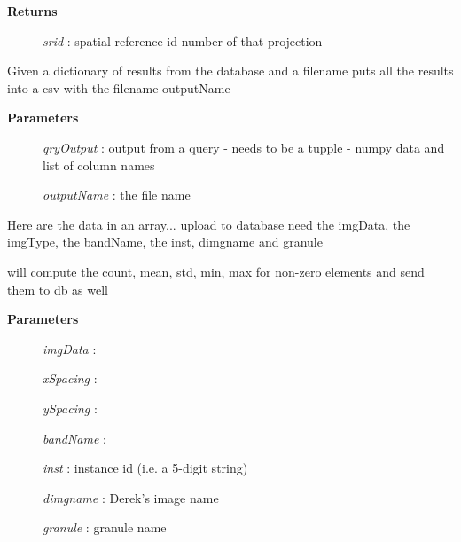 \documentclass[letterpaper,10pt,english]{sphinxmanual}
\begin{document}
\begin{fulllineitems}
\begin{fulllineitems}
\begin{description}
\item[{\textbf{Returns}}] \leavevmode
\emph{srid}  :   spatial reference id number of that projection

\end{description}

\end{fulllineitems}


\begin{fulllineitems}
\label{code:Database.Database.exportToCSV}
Given a dictionary of results from the database and a filename puts all the results
into a csv with the filename outputName
\begin{description}
\item[{\textbf{Parameters}}] \leavevmode
\emph{qryOutput}   : output from a query - needs to be a tupple - numpy data and list of column names

\emph{outputName}    : the file name

\end{description}

\end{fulllineitems}


\begin{fulllineitems}
\label{code:Database.Database.imgData2db}
Here are the data in an array... upload to database
need the imgData, the imgType, the bandName, the inst, dimgname and granule

will compute the count, mean, std, min, max for non-zero elements
and send them to db as well
\begin{description}
\item[{\textbf{Parameters}}] \leavevmode
\emph{imgData}   :

\emph{xSpacing}  :

\emph{ySpacing}  :

\emph{bandName}  :

\emph{inst}  :   instance id (i.e. a 5-digit string)

\emph{dimgname}  :   Derek's image name

\emph{granule}   :   granule name


\end{description}
\end{fulllineitems}
\end{fulllineitems}
\end{document}
